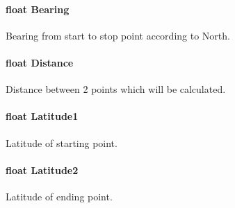 \paragraph[{Bearing}]{\setlength{\rightskip}{0pt plus 5cm}float Bearing}\label{struct_t_m___g_p_s___distance__t_aaad219b651c465ea6fac97c44ac074a2}
Bearing from start to stop point according to North. \hypertarget{struct_t_m___g_p_s___distance__t_ad387fb71b61baf6ce35cb7c4d5c16b17}{}
\paragraph[{Distance}]{\setlength{\rightskip}{0pt plus 5cm}float Distance}\label{struct_t_m___g_p_s___distance__t_ad387fb71b61baf6ce35cb7c4d5c16b17}
Distance between 2 points which will be calculated. \hypertarget{struct_t_m___g_p_s___distance__t_a196ead20874081c54da1766fed562e3b}{}
\paragraph[{Latitude1}]{\setlength{\rightskip}{0pt plus 5cm}float Latitude1}\label{struct_t_m___g_p_s___distance__t_a196ead20874081c54da1766fed562e3b}
Latitude of starting point. \hypertarget{struct_t_m___g_p_s___distance__t_acaa51fcd0573f464d6a97cfba1d01afd}{}
\paragraph[{Latitude2}]{\setlength{\rightskip}{0pt plus 5cm}float Latitude2}\label{struct_t_m___g_p_s___distance__t_acaa51fcd0573f464d6a97cfba1d01afd}
Latitude of ending point. \hypertarget{struct_t_m___g_p_s___distance__t_a55cb12186b5e6245fe68de089455b0c0}{}
